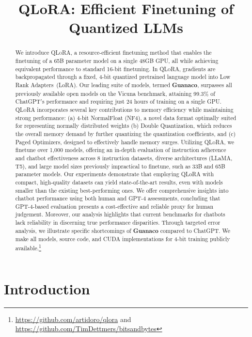 \title{QLoRA: Efficient Finetuning of Quantized LLMs}

\begin{abstract}
We introduce \textsc{QLoRA}, a resource-efficient finetuning method that enables the finetuning of a 65B parameter model on a single 48GB GPU, all while achieving equivalent performance to standard 16-bit finetuning. In \textsc{QLoRA}, gradients are backpropagated through a fixed, 4-bit quantized pretrained language model into Low Rank Adapters~(LoRA). Our leading suite of models, termed \textbf{Guanaco}, surpasses all previously available open models on the Vicuna benchmark, attaining 99.3\% of ChatGPT's performance and requiring just 24 hours of training on a single GPU. \textsc{QLoRA} incorporates several key contributions to memory efficiency while maintaining strong performance: (a) 4-bit NormalFloat (NF4), a novel data format optimally suited for representing normally distributed weights (b) Double Quantization, which reduces the overall memory demand by further quantizing the quantization coefficients, and (c) Paged Optimizers, designed to effectively handle memory surges. Utilizing \textsc{QLoRA}, we finetune over 1,000 models, offering an in-depth evaluation of instruction adherence and chatbot effectiveness across 8 instruction datasets, diverse architectures (LLaMA, T5), and large model sizes previously impractical to finetune, such as 33B and 65B parameter models. Our experiments demonstrate that employing QLoRA with compact, high-quality datasets can yield state-of-the-art results, even with models smaller than the existing best-performing ones. We offer comprehensive insights into chatbot performance using both human and GPT-4 assessments, concluding that GPT-4-based evaluation presents a cost-effective and reliable proxy for human judgement. Moreover, our analysis highlights that current benchmarks for chatbots lack reliability in discerning true performance disparities. Through targeted error analysis, we illustrate specific shortcomings of \textbf{Guanaco} compared to ChatGPT. We make all models, source code, and CUDA implementations for 4-bit training publicly available.\footnote{\url{https://github.com/artidoro/qlora} and \url{https://github.com/TimDettmers/bitsandbytes}}
\end{abstract}

\section{Introduction}


